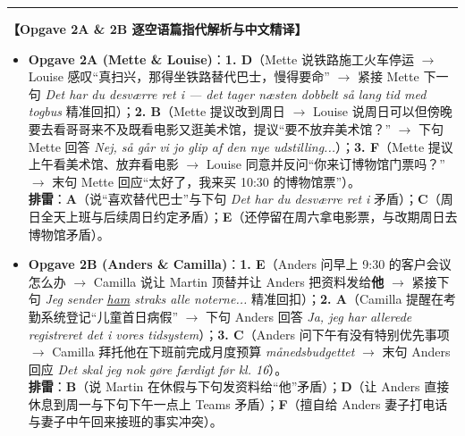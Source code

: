 \begin{answerbox}
\vspace{0.45em}
\hrule
\vspace{0.45em}
\textbf{\color{NCDNavy}【Opgave 2A \& 2B 逐空语篇指代解析与中文精译】}
\begin{itemize}
  \item \textbf{Opgave 2A (Mette \& Louise)}：\textbf{1. D}（Mette 说铁路施工火车停运 $\rightarrow$ Louise 感叹“真扫兴，那得坐铁路替代巴士，慢得要命” $\rightarrow$ 紧接 Mette 下一句 \textit{Det har du desværre ret i --- det tager næsten dobbelt så lang tid med togbus} 精准回扣）；\textbf{2. B}（Mette 提议改到周日 $\rightarrow$ Louise 说周日可以但傍晚要去看哥哥来不及既看电影又逛美术馆，提议“要不放弃美术馆？” $\rightarrow$ 下句 Mette 回答 \textit{Nej, så går vi jo glip af den nye udstilling...}）；\textbf{3. F}（Mette 提议上午看美术馆、放弃看电影 $\rightarrow$ Louise 同意并反问“你来订博物馆门票吗？” $\rightarrow$ 末句 Mette 回应“太好了，我来买 10:30 的博物馆票”）。\\
  \textbf{排雷}：\textbf{A}（说“喜欢替代巴士”与下句 \textit{Det har du desværre ret i} 矛盾）；\textbf{C}（周日全天上班与后续周日约定矛盾）；\textbf{E}（还停留在周六拿电影票，与改期周日去博物馆矛盾）。
  \item \textbf{Opgave 2B (Anders \& Camilla)}：\textbf{1. E}（Anders 问早上 9:30 的客户会议怎么办 $\rightarrow$ Camilla 说让 Martin 顶替并让 Anders 把资料发给\textbf{他} $\rightarrow$ 紧接下句 \textit{Jeg sender \underline{ham} straks alle noterne...} 精准回扣）；\textbf{2. A}（Camilla 提醒在考勤系统登记“儿童首日病假” $\rightarrow$ 下句 Anders 回答 \textit{Ja, jeg har allerede registreret det i vores tidsystem}）；\textbf{3. C}（Anders 问下午有没有特别优先事项 $\rightarrow$ Camilla 拜托他在下班前完成月度预算 \textit{månedsbudgettet} $\rightarrow$ 末句 Anders 回应 \textit{Det skal jeg nok gøre færdigt før kl. 16}）。\\
  \textbf{排雷}：\textbf{B}（说 Martin 在休假与下句发资料给“他”矛盾）；\textbf{D}（让 Anders 直接休息到周一与下句下午一点上 Teams 矛盾）；\textbf{F}（擅自给 Anders 妻子打电话与妻子中午回来接班的事实冲突）。
\end{itemize}


\end{answerbox}
